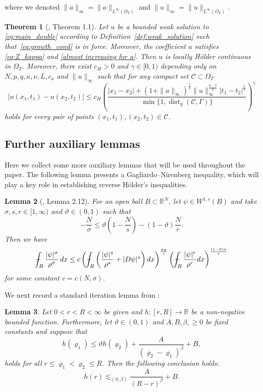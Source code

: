 \documentclass[10pt,a4paper]{amsart}
\newtheorem{theorem}{Theorem}[section]
\newtheorem{lemma}[theorem]{Lemma}
\numberwithin{equation}{section}
\newcommand{\RR}{\mathds{R}}
\DeclareMathOperator*{\dist}{dist}
\def\Xint#1{\mathchoice
	{\XXint\displaystyle\textstyle{#1}}%
	{\XXint\textstyle\scriptstyle{#1}}%
	{\XXint\scriptstyle\scriptscriptstyle{#1}}%
	{\XXint\scriptscriptstyle\scriptscriptstyle{#1}}%
	\!\int}
\def\XXint#1#2#3{{\setbox0=\hbox{$#1{#2#3}{\int}$}
		\vcenter{\hbox{$#2#3$}}\kern-.50\wd0}}
\def\Xint#1{\mathchoice
	{\XXint\displaystyle\textstyle{#1}}%
	{\XXint\textstyle\scriptstyle{#1}}%
	{\XXint\scriptstyle\scriptscriptstyle{#1}}%
	{\XXint\scriptscriptstyle\scriptscriptstyle{#1}}%
	\!\int}
\def\XXint#1#2#3{{\setbox0=\hbox{$#1{#2#3}{\int}$}
		\vcenter{\hbox{$#2#3$}}\kern-.50\wd0}}
\def\dashint{\Xint-}
\begin{document}
where we denoted $\|a\|_{\infty}=\|a \|_{L^\infty(\Omega_T)}$ and $\|u\|_{\infty}=\|u \|_{L^\infty(\Omega_T)}$.

\begin{theorem}[\cite{Kim2025holder}, Theorem 1.1]\label{holder cts thm}
Let $u$ be a bounded weak solution to \eqref{eq:main_double} according to Definition~\ref{def:weak_solution} such that~\eqref{eq:growth_cond} is in force. Moreover, the coefficient $a$ satisfies \eqref{eq:Z_kappa} and \eqref{almost increasing for a}. Then $u$ is locally H\"older continuous in $\Omega_T$. Moreover, there exist $c_H > 0$ and $\gamma \in[0,1)$ depending only on $N,p,q,\kappa, \nu, L, c_a$ and $\|u\|_\infty$ such that for any compact set $\mathcal{C} \subset \Omega_T$
     $$
     |u(x_1,t_1)-u(x_2,t_2)|\le c_H\left(\frac{|x_1-x_2|+(1+\|a\|_\infty)^\frac{1}{q}\|u\|_{\infty}^{\frac{q-2}{q}}|t_1-t_2|^\frac{1}{q} }{\min\{1,\dist_q(\mathcal{C}, \Gamma ) \}}\right)^\gamma
     $$
     holds for every pair of points $(x_1,t_1),(x_2,t_2)\in \mathcal{C}$. 
\end{theorem}


\subsection{Further auxiliary lemmas} Here we collect some more auxiliary lemmas that will be used throughout the paper. The following lemma presents a Gagliardo–Nirenberg inequality, which will play a key role in establishing reverse H\"{o}lder's inequalities.
\begin{lemma}[\cite{Hasto_2021}, Lemma 2.12]\label{lem : lemma 2.1}
For an open ball $B\subset \RR^N$, let $\psi \in W^{1, s}(B)$ and take $\sigma, s, r \in[1, \infty)$ and $\vartheta \in(0,1)$ such that
    $$
    -\frac{N}{\sigma} \leq \vartheta\left(1-\frac{N}{s}\right)-(1-\vartheta) \frac{N}{r}.
    $$
    Then we have
    $$
    \dashint_{B} \frac{|\psi|^\sigma}{\rho^\sigma} \, d x \leq c\left(\dashint_{B}\left(\frac{|\psi|^s}{\rho^s}+|D\psi|^s\right) d x\right)^{\frac{\vartheta \sigma}{s}}\left(\dashint_{B} \frac{|\psi|^r}{\rho^r} d x\right)^{\frac{(1-\vartheta) \sigma}{r}}
    $$
    for some constant $c=c(N, \sigma)$.
\end{lemma}
We next record a standard iteration lemma from \cite[Lemma 1.1]{GG82}:
\begin{lemma}
	\label{iter_lemma}
	Let $0< r< R<\infty$ be given and $h : [r, R] \to \RR$ be a non-negative bounded function. Furthermore, let $\vartheta \in (0,1)$ and $A,B,\beta, \geq 0$ be fixed constants and 
	suppose that
	$$
	h(\varrho_1) \leq \vartheta h(\varrho_2) + \frac{A}{(\varrho_2-\varrho_1)^{\beta}} + B,
	$$
	holds for all $r \leq \varrho_1 < \varrho_2 \leq R$.
    Then the following conclusion holds:
	$$
	h(r) \lesssim_{(\vartheta,\beta)} \frac{A}{(R-r)^{\beta}} + B.
	$$
\end{lemma} 
\end{document}
